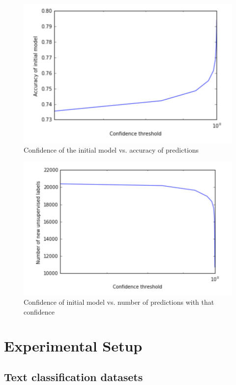 \documentclass[11pt,letterpaper]{article}
\begin{document}
\begin{figure}
	\includegraphics[scale = .45]{conf-acc}
	\caption{Confidence of the initial model vs. accuracy of predictions}
\end{figure}

\begin{figure}
	\includegraphics[scale = .45]{conf-num}
	\caption{Confidence of initial model vs. number of predictions with that confidence}
\end{figure}

\clearpage

\section{Experimental Setup}

\subsection{Text classification datasets}
\end{document}
